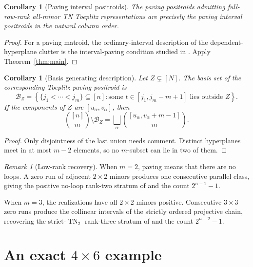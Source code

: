 \documentclass{amsart}
\numberwithin{equation}{section}
\newtheorem{corollary}[theorem]{Corollary}
\theoremstyle{definition}
\theoremstyle{remark}
\newtheorem{remark}[theorem]{Remark}
\DeclareMathOperator{\TN}{TN}
\newcommand{\cB}{\mathcal B}
\begin{document}
\begin{corollary}[Paving interval positroids]\label{cor:paving-interval}
The paving positroids admitting full-row-rank all-minor TN Toeplitz representations are precisely the paving interval positroids in the natural column order.
\end{corollary}

\begin{proof}
For a paving matroid, the ordinary-interval description of the dependent-hyperplane clutter is the interval-paving condition studied in \cite{Park}.  Apply Theorem~\ref{thm:main}.
\end{proof}

\begin{corollary}[Basis generating description]\label{cor:basis-description}
Let $Z\subsetneq[N]$.  The basis set of the corresponding Toeplitz paving positroid is
\[
 \cB_Z=\left\{\{j_1<\cdots<j_m\}\subseteq[n]:
 \text{some }t\in[j_1,j_m-m+1]\text{ lies outside }Z\right\}.
\]
If the components of $Z$ are $[u_\alpha,v_\alpha]$, then
\[
 \binom{[n]}m\setminus\cB_Z
 =\bigsqcup_\alpha\binom{[u_\alpha,v_\alpha+m-1]}m.
\]
\end{corollary}

\begin{proof}
Only disjointness of the last union needs comment.  Distinct hyperplanes meet in at most $m-2$ elements, so no $m$-subset can lie in two of them.
\end{proof}

\begin{remark}[Low-rank recovery]\label{rem:low-rank-recovery}
When $m=2$, paving means that there are no loops.  A zero run of adjacent $2\times2$ minors produces one consecutive parallel class, giving the positive no-loop rank-two stratum of \cite[Theorem~3 and Corollary~4]{PaperA} and the count $2^{n-1}-1$.

When $m=3$, the realizations have all $2\times2$ minors positive.  Consecutive $3\times3$ zero runs produce the collinear intervals of the strictly ordered projective chain, recovering the strict-$\TN_2$ rank-three stratum of \cite[Corollary~9]{PaperA} and the count $2^{n-2}-1$.
\end{remark}

\section{An exact \texorpdfstring{$4\times6$}{4 by 6} example}\label{sec:example}
\end{document}

